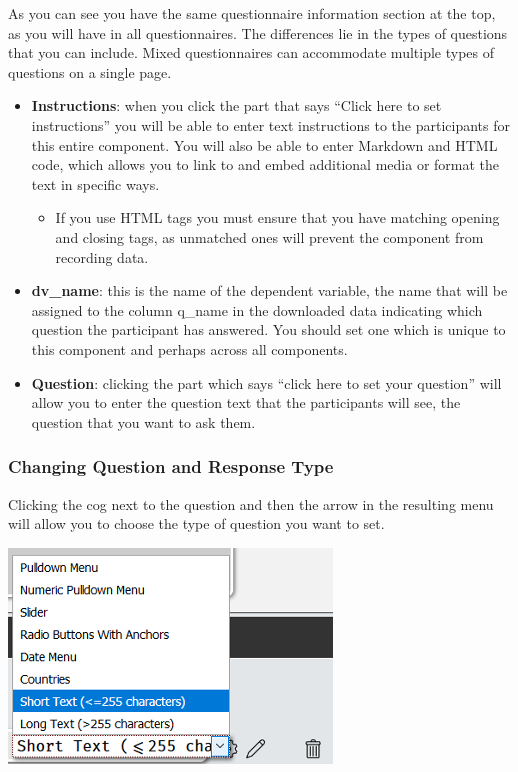 \documentclass[]{book}
\providecommand{\tightlist}{%
  \setlength{\itemsep}{0pt}\setlength{\parskip}{0pt}}
\begin{document}
As you can see you have the same questionnaire information section at the top, as you will have in all questionnaires. The differences lie in the types of questions that you can include. Mixed questionnaires can accommodate multiple types of questions on a single page.

\begin{itemize}
\tightlist
\item
  \textbf{Instructions}: when you click the part that says ``Click here to set instructions'' you will be able to enter text instructions to the participants for this entire component. You will also be able to enter Markdown and HTML code, which allows you to link to and embed additional media or format the text in specific ways.

  \begin{itemize}
  \tightlist
  \item
    If you use HTML tags you must ensure that you have matching opening and closing tags, as unmatched ones will prevent the component from recording data.
  \end{itemize}
\item
  \textbf{dv\_name}: this is the name of the dependent variable, the name that will be assigned to the column q\_name in the downloaded data indicating which question the participant has answered. You should set one which is unique to this component and perhaps across all components.
\item
  \textbf{Question}: clicking the part which says ``click here to set your question'' will allow you to enter the question text that the participants will see, the question that you want to ask them.
\end{itemize}

\hypertarget{changing-question-and-response-type}{%
\subsubsection{Changing Question and Response Type}\label{changing-question-and-response-type}}

Clicking the cog next to the question and then the arrow in the resulting menu will allow you to choose the type of question you want to set.

\includegraphics{images/screenshots/quest_mixed_1.png}
\end{document}
